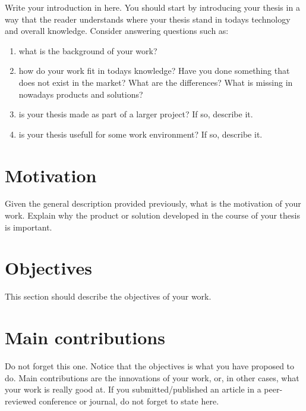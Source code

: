 \documentclass[defaultstyle,10pt,master,Helvetica]{thesis}
\begin{document}
% 

\setcounter{page}{1} 
\baselineskip 18pt

Write your introduction in here. You should start by introducing your thesis in a way that the reader understands where your thesis stand in todays technology and overall knowledge. Consider answering questions such as:
\begin{enumerate}
 \item what is the background of your work?
 \item how do your work fit in todays knowledge? Have you done something that does not exist in the market? What are the differences? What is missing in nowadays products and solutions?
 \item is your thesis made as part of a larger project? If so, describe it.
 \item is your thesis usefull for some work environment? If so, describe it.
\end{enumerate}

\section{Motivation}

Given the general description provided previously, what is the motivation of your work. Explain why the product or solution developed in the course of your thesis is important.

\section{Objectives}

This section should describe the objectives of your work.

\section{Main contributions}
Do not forget this one. Notice that the objectives is what you have proposed to do. Main contributions are the innovations of your work, or, in other cases, what your work is really good at. If you submitted/published an article in a peer-reviewed conference or journal, do not forget to state here.
\end{document}
